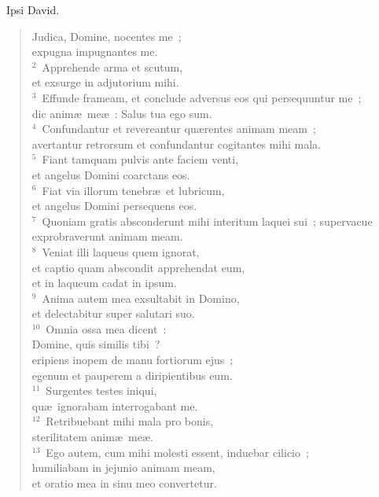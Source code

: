 ~\lettrine[lines=10,image=true,loversize=0.05,lraise=-0.03]{I}{}psi David. \begin{flushleft}\begin{verse}\vspace{6pt}Judica, Domine, nocentes me~;\\ expugna impugnantes me.\\
${}^{2}$~Apprehende arma et scutum,\\ et exsurge in adjutorium mihi.\\
${}^{3}$~Effunde frameam, et conclude adversus eos qui persequuntur me~;\\ dic anim\ae\ me\ae~: Salus tua ego sum.\\
${}^{4}$~Confundantur et revereantur qu\ae rentes animam meam~;\\ avertantur retrorsum et confundantur cogitantes mihi mala.\\
${}^{5}$~Fiant tamquam pulvis ante faciem venti,\\ et angelus Domini coarctans eos.\\
${}^{6}$~Fiat via illorum tenebr\ae\ et lubricum,\\ et angelus Domini persequens eos.\\
${}^{7}$~Quoniam gratis absconderunt mihi interitum laquei sui~; supervacue exprobraverunt animam meam.\\
${}^{8}$~Veniat illi laqueus quem ignorat,\\ et captio quam abscondit apprehendat eum,\\ et in laqueum cadat in ipsum.\\
${}^{9}$~Anima autem mea exsultabit in Domino,\\ et delectabitur super salutari suo.\\
${}^{10}$~Omnia ossa mea dicent~:\\ Domine, quis similis tibi~?\\ eripiens inopem de manu fortiorum ejus~;\\ egenum et pauperem a diripientibus eum.\\
${}^{11}$~Surgentes testes iniqui,\\ qu\ae\ ignorabam interrogabant me.\\
${}^{12}$~Retribuebant mihi mala pro bonis,\\ sterilitatem anim\ae\ me\ae .\\
${}^{13}$~Ego autem, cum mihi molesti essent, induebar cilicio~;\\ humiliabam in jejunio animam meam,\\ et oratio mea in sinu meo convertetur.\\

\end{verse}
\end{flushleft}

